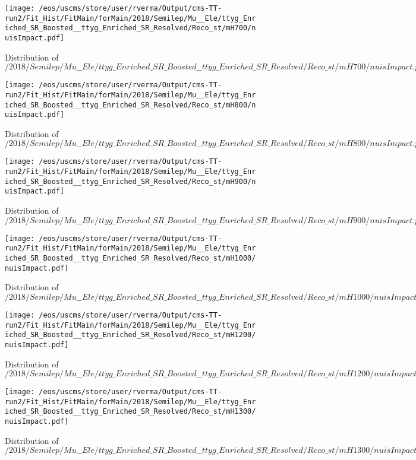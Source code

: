 \begin{figure}
\centering
\texttt{[image: /eos/uscms/store/user/rverma/Output/cms-TT-run2/Fit\_Hist/FitMain/forMain/2018/Semilep/Mu\_\_Ele/ttyg\_Enriched\_SR\_Boosted\_\_ttyg\_Enriched\_SR\_Resolved/Reco\_st/mH700/nuisImpact.pdf]}
\caption{Distribution of $/2018/Semilep/Mu\_\_Ele/ttyg\_Enriched\_SR\_Boosted\_\_ttyg\_Enriched\_SR\_Resolved/Reco\_st/mH700/nuisImpact.pdf$}
\end{figure}

\begin{figure}
\centering
\texttt{[image: /eos/uscms/store/user/rverma/Output/cms-TT-run2/Fit\_Hist/FitMain/forMain/2018/Semilep/Mu\_\_Ele/ttyg\_Enriched\_SR\_Boosted\_\_ttyg\_Enriched\_SR\_Resolved/Reco\_st/mH800/nuisImpact.pdf]}
\caption{Distribution of $/2018/Semilep/Mu\_\_Ele/ttyg\_Enriched\_SR\_Boosted\_\_ttyg\_Enriched\_SR\_Resolved/Reco\_st/mH800/nuisImpact.pdf$}
\end{figure}

\begin{figure}
\centering
\texttt{[image: /eos/uscms/store/user/rverma/Output/cms-TT-run2/Fit\_Hist/FitMain/forMain/2018/Semilep/Mu\_\_Ele/ttyg\_Enriched\_SR\_Boosted\_\_ttyg\_Enriched\_SR\_Resolved/Reco\_st/mH900/nuisImpact.pdf]}
\caption{Distribution of $/2018/Semilep/Mu\_\_Ele/ttyg\_Enriched\_SR\_Boosted\_\_ttyg\_Enriched\_SR\_Resolved/Reco\_st/mH900/nuisImpact.pdf$}
\end{figure}

\begin{figure}
\centering
\texttt{[image: /eos/uscms/store/user/rverma/Output/cms-TT-run2/Fit\_Hist/FitMain/forMain/2018/Semilep/Mu\_\_Ele/ttyg\_Enriched\_SR\_Boosted\_\_ttyg\_Enriched\_SR\_Resolved/Reco\_st/mH1000/nuisImpact.pdf]}
\caption{Distribution of $/2018/Semilep/Mu\_\_Ele/ttyg\_Enriched\_SR\_Boosted\_\_ttyg\_Enriched\_SR\_Resolved/Reco\_st/mH1000/nuisImpact.pdf$}
\end{figure}

\begin{figure}
\centering
\texttt{[image: /eos/uscms/store/user/rverma/Output/cms-TT-run2/Fit\_Hist/FitMain/forMain/2018/Semilep/Mu\_\_Ele/ttyg\_Enriched\_SR\_Boosted\_\_ttyg\_Enriched\_SR\_Resolved/Reco\_st/mH1200/nuisImpact.pdf]}
\caption{Distribution of $/2018/Semilep/Mu\_\_Ele/ttyg\_Enriched\_SR\_Boosted\_\_ttyg\_Enriched\_SR\_Resolved/Reco\_st/mH1200/nuisImpact.pdf$}
\end{figure}

\begin{figure}
\centering
\texttt{[image: /eos/uscms/store/user/rverma/Output/cms-TT-run2/Fit\_Hist/FitMain/forMain/2018/Semilep/Mu\_\_Ele/ttyg\_Enriched\_SR\_Boosted\_\_ttyg\_Enriched\_SR\_Resolved/Reco\_st/mH1300/nuisImpact.pdf]}
\caption{Distribution of $/2018/Semilep/Mu\_\_Ele/ttyg\_Enriched\_SR\_Boosted\_\_ttyg\_Enriched\_SR\_Resolved/Reco\_st/mH1300/nuisImpact.pdf$}
\end{figure}

